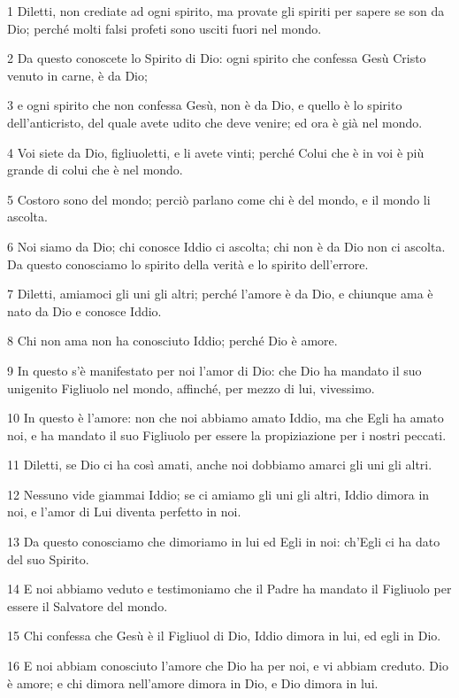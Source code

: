 \par 1 Diletti, non crediate ad ogni spirito, ma provate gli spiriti per sapere se son da Dio; perché molti falsi profeti sono usciti fuori nel mondo.
\par 2 Da questo conoscete lo Spirito di Dio: ogni spirito che confessa Gesù Cristo venuto in carne, è da Dio;
\par 3 e ogni spirito che non confessa Gesù, non è da Dio, e quello è lo spirito dell'anticristo, del quale avete udito che deve venire; ed ora è già nel mondo.
\par 4 Voi siete da Dio, figliuoletti, e li avete vinti; perché Colui che è in voi è più grande di colui che è nel mondo.
\par 5 Costoro sono del mondo; perciò parlano come chi è del mondo, e il mondo li ascolta.
\par 6 Noi siamo da Dio; chi conosce Iddio ci ascolta; chi non è da Dio non ci ascolta. Da questo conosciamo lo spirito della verità e lo spirito dell'errore.
\par 7 Diletti, amiamoci gli uni gli altri; perché l'amore è da Dio, e chiunque ama è nato da Dio e conosce Iddio.
\par 8 Chi non ama non ha conosciuto Iddio; perché Dio è amore.
\par 9 In questo s'è manifestato per noi l'amor di Dio: che Dio ha mandato il suo unigenito Figliuolo nel mondo, affinché, per mezzo di lui, vivessimo.
\par 10 In questo è l'amore: non che noi abbiamo amato Iddio, ma che Egli ha amato noi, e ha mandato il suo Figliuolo per essere la propiziazione per i nostri peccati.
\par 11 Diletti, se Dio ci ha così amati, anche noi dobbiamo amarci gli uni gli altri.
\par 12 Nessuno vide giammai Iddio; se ci amiamo gli uni gli altri, Iddio dimora in noi, e l'amor di Lui diventa perfetto in noi.
\par 13 Da questo conosciamo che dimoriamo in lui ed Egli in noi: ch'Egli ci ha dato del suo Spirito.
\par 14 E noi abbiamo veduto e testimoniamo che il Padre ha mandato il Figliuolo per essere il Salvatore del mondo.
\par 15 Chi confessa che Gesù è il Figliuol di Dio, Iddio dimora in lui, ed egli in Dio.
\par 16 E noi abbiam conosciuto l'amore che Dio ha per noi, e vi abbiam creduto. Dio è amore; e chi dimora nell'amore dimora in Dio, e Dio dimora in lui.
